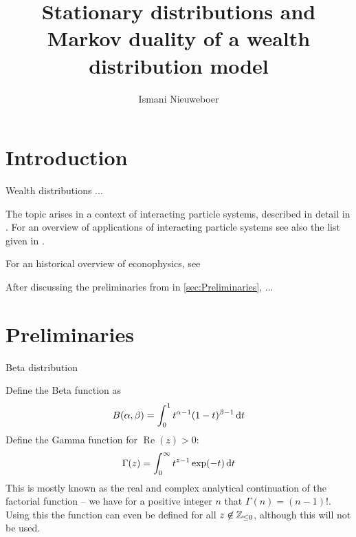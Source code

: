 \documentclass{article}
\title{Stationary distributions and Markov duality of a wealth distribution model}
\author{Ismani Nieuweboer}
\begin{document}
\maketitle











\section*{Introduction}
Wealth distributions ...

The topic arises in a context of interacting particle systems, described in detail in  \cite{liggett2012interacting, liggett2013stochastic}. For an overview of applications of interacting particle systems see also the list given in \cite{frankredig2014}.

For an historical overview of econophysics, see \cite{2008arXiv0802.1416D, 2011arXiv1108.0977S}

After discussing the preliminaries from \cite{frankredig2014} in \autoref{sec:Preliminaries}, ...


\section{Preliminaries}%
Beta distribution

Define the Beta function as
\[
B(\alpha, \beta)
= \int_{0}^{1} t^{\alpha-1} (1-t)^{\beta-1} \mathop{}\!\mathrm{d} t
\]
Define the Gamma function for $\operatorname*{Re}(z) > 0$:
\[
\Gamma(z)
= \int_{0}^{\infty} t^{z-1} \exp(-t) \mathop{}\!\mathrm{d} t
\]
This is mostly known as the real and complex analytical continuation of the factorial function -- we have for a positive integer $n$ that $\Gamma(n) = (n-1)!$. Using this the function can even be defined for all $z \not \in \mathbb{Z}_{\le 0}$, although this will not be used.
\end{document}
